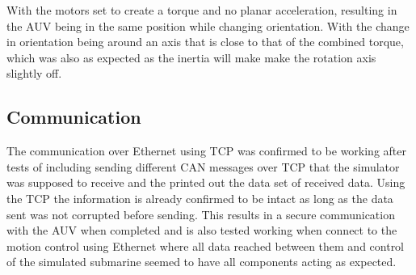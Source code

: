 With the motors set to create a torque and no planar acceleration, resulting in the AUV being in the same position while changing orientation. With the change in orientation being around an axis that is close to that of the combined torque, which was also as expected as the inertia will make make the rotation axis slightly off.

\subsection{Communication}
The communication over Ethernet using TCP was confirmed to be working after tests of including sending different CAN messages over TCP that the simulator was supposed to receive and the printed out the data set of received data. Using the TCP the information is already confirmed to be intact as long as the data sent was not corrupted before sending. This results in a secure communication with the AUV when completed and is also tested working when connect to the motion control using Ethernet where all data reached between them and control of the simulated submarine seemed to have all components acting as expected. 

	
